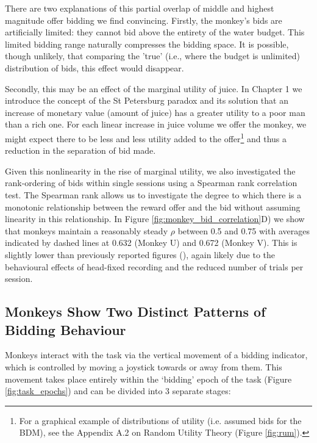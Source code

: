 There are two explanations of this partial overlap of middle and highest magnitude offer bidding we find convincing. Firstly, the monkey’s bids are artificially limited: they cannot bid above the entirety of the water budget. This limited bidding range naturally compresses the bidding space. It is possible, though unlikely, that comparing the 'true' (i.e., where the budget is unlimited) distribution of bids, this effect would disappear.

Secondly, this may be an effect of the marginal utility of juice. In Chapter 1 we introduce the concept of the St Petersburg paradox and its solution that an increase of monetary value (amount of juice) has a greater utility to a poor man than a rich one. For each linear increase in juice volume we offer the monkey, we might expect there to be less and less utility added to the offer\footnote{For a graphical example of distributions of utility (i.e. assumed bids for the BDM), see the Appendix A.2 on Random Utility Theory (Figure \ref{fig:rum}).} and thus a reduction in the separation of bid made.

Given this nonlinearity in the rise of marginal utility, we also investigated the rank-ordering of bids within single sessions using a Spearman rank correlation test. The Spearman rank allows us to investigate the degree to which there is a monotonic relationship between the reward offer and the bid without assuming linearity in this relationship. In Figure \ref{fig:monkey_bid_correlation}D) we show that monkeys maintain a reasonably steady $\rho$ between 0.5 and 0.75 with averages indicated by dashed lines at 0.632 (Monkey U) and 0.672 (Monkey V). This is slightly lower than previously reported figures (\cite{almohammadRewardValueRevealed2022}), again likely due to the behavioural effects of head-fixed recording and the reduced number of trials per session.

\subsection{Monkeys Show Two Distinct Patterns of Bidding Behaviour}

Monkeys interact with the task via the vertical movement of a bidding indicator, which is controlled by moving a joystick towards or away from them. This movement takes place entirely within the ‘bidding’ epoch of the task (Figure \ref{fig:task_epochs}) and can be divided into 3 separate stages:

